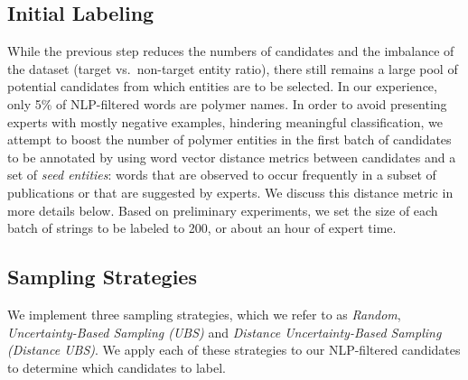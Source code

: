\subsection{Initial Labeling}
While the previous step %
reduces the numbers of candidates and the imbalance of the dataset (target vs.\ non-target entity ratio), 
there still remains a large pool of potential candidates from which entities are to be selected.
In our experience, only 5\% of NLP-filtered words are polymer names.
In order to avoid presenting experts with mostly negative examples, hindering meaningful classification,
we attempt to boost the number of polymer entities in the first batch of candidates to be annotated by using word vector distance metrics between candidates and a set of \emph{seed entities}:
words that are observed to occur frequently  
in a subset of publications or that are suggested by experts.
We discuss this distance metric in more details below.
Based on preliminary experiments, we set the size of each batch of strings to be labeled to 200, 
or about an hour of expert time.

\subsection{Sampling Strategies}
We implement three sampling strategies, which we refer to as \textit{Random}, \textit{Uncertainty-Based Sampling (UBS)} and \textit{Distance Uncertainty-Based Sampling (Distance UBS)}.
We apply each of these strategies to our NLP-filtered candidates to determine which candidates to label.

